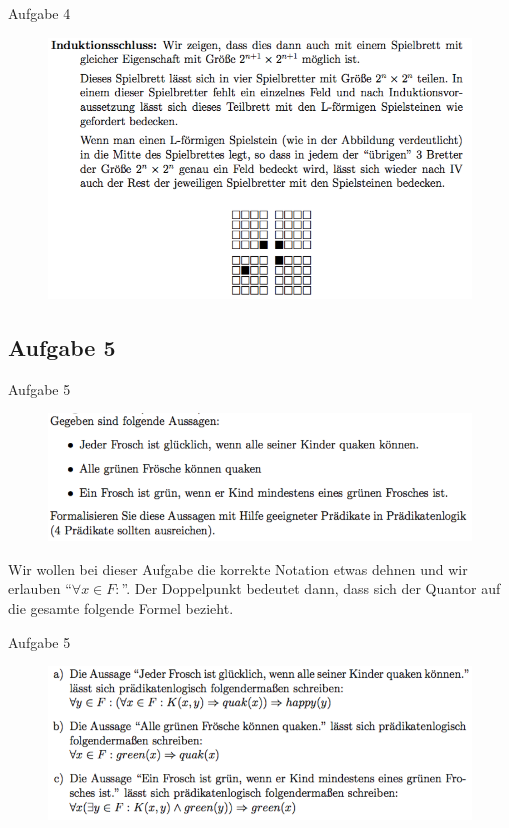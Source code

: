 \begin{frame}{Aufgabe 4}
\begin{figure}[h!]
		\centering
		\includegraphics[width=\textwidth]{../topics/weihnachtstut-aufgaben/10.png} 
	\end{figure}    
\end{frame}

\subsection{Aufgabe 5}
\begin{frame}{Aufgabe 5}
\begin{figure}[h!]
		\centering
		\includegraphics[width=\textwidth]{../topics/weihnachtstut-aufgaben/11.png} 
	\end{figure}     

	Wir wollen bei dieser Aufgabe die korrekte Notation etwas dehnen und wir erlauben \enquote{$\forall x \in F:$}. Der Doppelpunkt bedeutet dann, dass sich der Quantor auf die gesamte folgende Formel bezieht.
\end{frame}

\begin{frame}{Aufgabe 5}
\begin{figure}[h!]
		\centering
		\includegraphics[width=\textwidth]{../topics/weihnachtstut-aufgaben/12.png} 
\end{figure} 

\end{frame}   
   	

